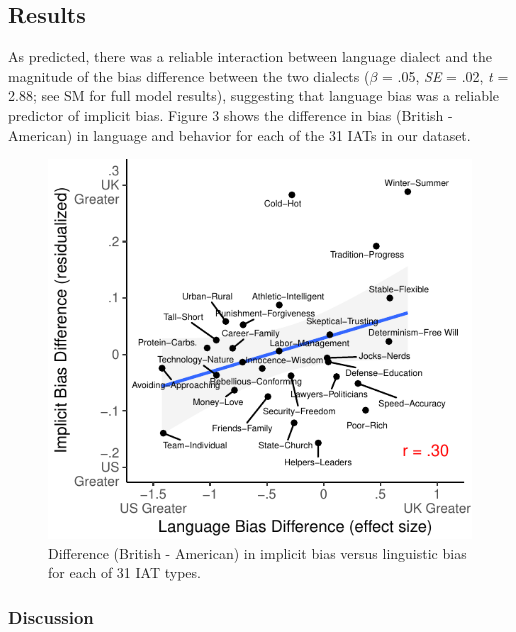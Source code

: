 \documentclass[man,floatsintext]{apa6}
\begin{document}
\hypertarget{results-3}{%
\subsection{Results}\label{results-3}}

As predicted, there was a reliable interaction between language dialect and the magnitude of the bias difference between the two dialects (\(\beta\) = .05, \emph{SE} = .02, \emph{t} = 2.88; see SM for full model results), suggesting that language bias was a reliable predictor of implicit bias. Figure 3 shows the difference in bias (British - American) in language and behavior for each of the 31 IATs in our dataset.

\begin{figure}
\centering
\includegraphics{iat_lang_pnas_files/figure-latex/1cplot-1.pdf}
\caption{\label{fig:1cplot}Difference (British - American) in implicit bias versus linguistic bias for each of 31 IAT types.}
\end{figure}

\hypertarget{discussion}{%
\subsubsection{Discussion}\label{discussion}}
\end{document}
